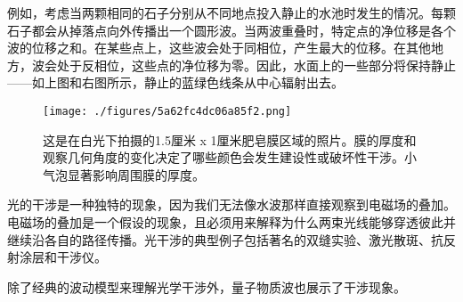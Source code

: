 例如，考虑当两颗相同的石子分别从不同地点投入静止的水池时发生的情况。每颗石子都会从掉落点向外传播出一个圆形波。当两波重叠时，特定点的净位移是各个波的位移之和。在某些点上，这些波会处于同相位，产生最大的位移。在其他地方，波会处于反相位，这些点的净位移为零。因此，水面上的一些部分将保持静止——如上图和右图所示，静止的蓝绿色线条从中心辐射出去。
\begin{figure}[ht]
\centering
\texttt{[image: ./figures/5a62fc4dc06a85f2.png]}
\caption{这是在白光下拍摄的1.5厘米 x 1厘米肥皂膜区域的照片。膜的厚度和观察几何角度的变化决定了哪些颜色会发生建设性或破坏性干涉。小气泡显著影响周围膜的厚度。} \label{fig_GSWLX_5}
\end{figure}
光的干涉是一种独特的现象，因为我们无法像水波那样直接观察到电磁场的叠加。电磁场的叠加是一个假设的现象，且必须用来解释为什么两束光线能够穿透彼此并继续沿各自的路径传播。光干涉的典型例子包括著名的双缝实验、激光散斑、抗反射涂层和干涉仪。

除了经典的波动模型来理解光学干涉外，量子物质波也展示了干涉现象。